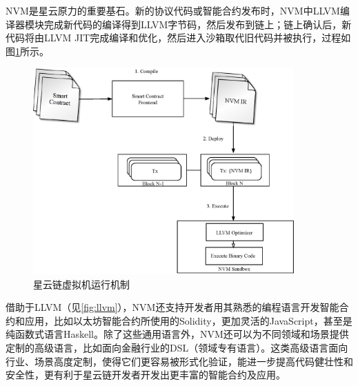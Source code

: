 NVM是星云原力的重要基石。新的协议代码或智能合约发布时，NVM中LLVM编译器模块完成新代码的编译得到LLVM字节码，然后发布到链上；链上确认后，新代码将由LLVM
JIT完成编译和优化，然后进入沙箱取代旧代码并被执行，过程如图\ref{fig:nvm-process}所示。 \\

\begin{figure}[h]
\centering
\includegraphics[width=10cm]{./figs/nvm-process}
\caption{星云链虚拟机运行机制}
\label{fig:nvm-process}
\end{figure}

借助于LLVM（见\ref{fig:llvm}），NVM还支持开发者用其熟悉的编程语言开发智能合约和应用，比如以太坊智能合约所使用的Solidity，更加灵活的JavaScript，甚至是纯函数式语言Haskell。除了这些通用语言外，NVM还可以为不同领域和场景提供定制的高级语言，比如面向金融行业的DSL（领域专有语言）。这类高级语言面向行业、场景高度定制，使得它们更容易被形式化验证，能进一步提高代码健壮性和安全性，更有利于星云链开发者开发出更丰富的智能合约及应用。
